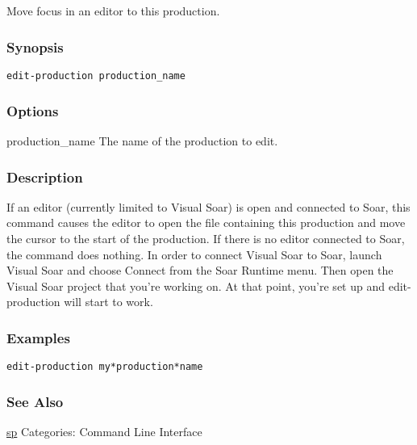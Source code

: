 \subsection{}
\label{edit-production}
Move focus in an editor to this production. 
\subsubsection*{Synopsis}
\begin{verbatim}
edit-production production_name
\end{verbatim}
\subsubsection*{Options}
 production\_name The name of the production to edit. 
\subsubsection*{Description}
 If an editor (currently limited to Visual Soar) is open and connected to Soar, this command causes the editor to open the file containing this production and move the cursor to the start of the production. If there is no editor connected to Soar, the command does nothing. In order to connect Visual Soar to Soar, launch Visual Soar and choose Connect from the Soar Runtime menu. Then open the Visual Soar project that you're working on. At that point, you're set up and edit-production will start to work. 
\subsubsection*{Examples}
\begin{verbatim}
edit-production my*production*name
\end{verbatim}
\subsubsection*{See Also}
\hyperref[sp]{sp}  Categories: Command Line Interface

